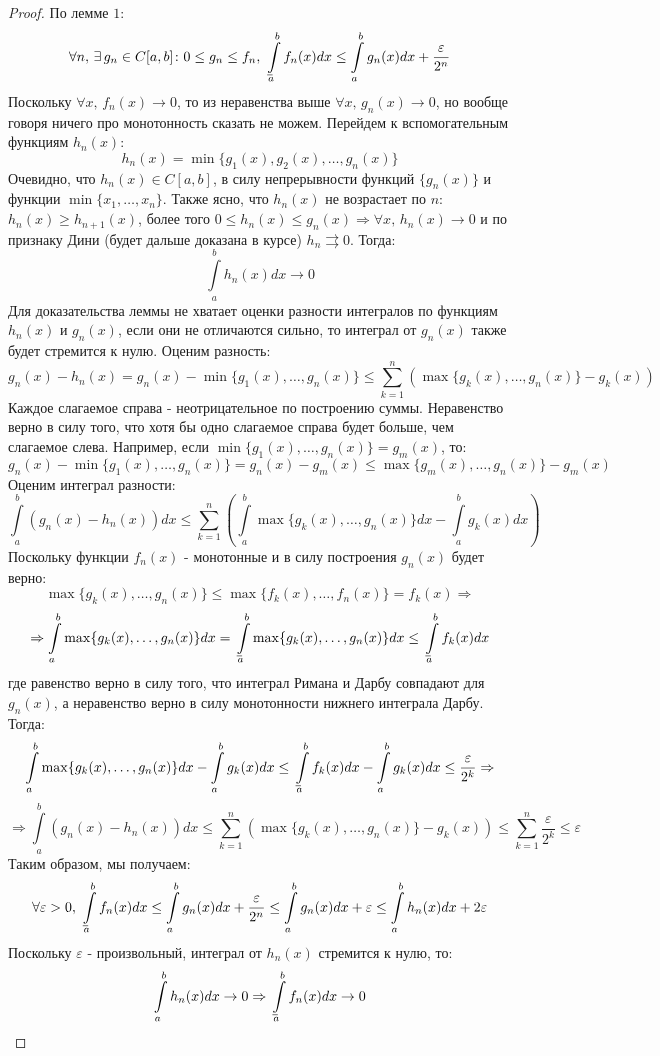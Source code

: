 \documentclass[12pt]{article}
\newcommand{\VE}{\varepsilon}
\theoremstyle{definition}
\newcommand{\ddint}[2]{\displaystyle\int\limits_{#1}^{#2}}
\newcommand{\uconv}[1]{\overset{#1}{\rightrightarrows}}
\def\lowint{\mkern3mu\underline{\vphantom{\intop}\mkern7mu}\mkern-10mu\int}
\begin{document}
\begin{proof}
	По лемме $1$:
	$$
		\forall n, \, \exists \, g_n \in C[a,b] \colon 0 \leq g_n \leq f_n, \,  \lowint\limits_{a}^{b}f_n(x)dx \leq \ddint{a}{b}g_n(x)dx + \dfrac{\VE}{2^n}
	$$
	Поскольку $\forall x, \, f_n(x) \to 0$, то из неравенства выше $\forall x, \, g_n(x) \to 0$, но вообще говоря ничего про монотонность сказать не можем. Перейдем к вспомогательным функциям $h_n(x)$:
	$$
		h_n(x) = \min\{g_1(x), g_2(x), \dotsc, g_n(x)\}
	$$
	Очевидно, что $h_n(x) \in C[a,b]$, в силу непрерывности функций $\{g_n(x)\}$ и функции $\min\{x_1, \dotsc, x_n\}$. Также ясно, что $h_n(x)$ не возрастает по $n$: $h_n(x) \geq h_{n+1}(x)$, более того $0 \leq h_n(x) \leq g_n(x) \Rightarrow \forall x, \, h_n(x) \to 0$ и по признаку Дини (будет дальше доказана в курсе) $h_n \uconv{} 0$. Тогда:
	$$
		\ddint{a}{b}h_n(x)dx \to 0
	$$
	Для доказательства леммы не хватает оценки разности интегралов по функциям $h_n(x)$ и $g_n(x)$, если они не отличаются сильно, то интеграл от $g_n(x)$ также будет стремится к нулю. Оценим разность:
	$$
		g_n(x) - h_n(x) = g_n(x) - \min\{g_1(x), \dotsc, g_n(x)\} \leq \sum\limits_{k = 1}^n \left(\max\{g_k(x),\dotsc,g_n(x)\} - g_k(x)\right)
	$$
	Каждое слагаемое справа - неотрицательное по построению суммы. Неравенство верно в силу того, что хотя бы одно слагаемое справа будет больше, чем слагаемое слева. Например, если $\min\{g_1(x), \dotsc, g_n(x)\} = g_m(x)$, то:
	$$
		 g_n(x) - \min\{g_1(x), \dotsc, g_n(x)\} = g_n(x) - g_m(x) \leq \max\{g_m(x), \dotsc, g_n(x)\} - g_m(x)
	$$
	Оценим интеграл разности:
	$$
		\ddint{a}{b} (g_n(x) - h_n(x))dx \leq \sum\limits_{k = 1}^n\left(\ddint{a}{b} \max\{g_k(x),\dotsc,g_n(x)\}dx - \ddint{a}{b}g_k(x)dx\right)
	$$
	Поскольку функции $f_n(x)$ - монотонные и в силу построения $g_n(x)$ будет верно: 
	$$
		\max\{g_k(x),\dotsc,g_n(x)\} \leq \max\{f_k(x),\dotsc,f_n(x)\} = f_k(x) \Rightarrow 
	$$
	$$
		\Rightarrow\ddint{a}{b} \max\{g_k(x),\dotsc,g_n(x)\}dx  = \lowint\limits_{a}^{b} \max\{g_k(x),\dotsc,g_n(x)\}dx \leq \lowint\limits_{a}^{b}f_k(x) dx
	$$
	где равенство верно в силу того, что интеграл Римана и Дарбу совпадают для $g_n(x)$, а неравенство верно в силу монотонности нижнего интеграла Дарбу. Тогда:
	$$
		\ddint{a}{b} \max\{g_k(x),\dotsc,g_n(x)\}dx - \ddint{a}{b}g_k(x)dx \leq \lowint\limits_{a}^{b}f_k(x) dx - \ddint{a}{b}g_k(x)dx \leq \dfrac{\VE}{2^k} \Rightarrow
	$$
	$$
		\Rightarrow \ddint{a}{b}\left(g_n(x) - h_n(x)\right)dx \leq \sum\limits_{k = 1}^n \left(\max\{g_k(x),\dotsc,g_n(x)\} - g_k(x)\right) \leq \sum\limits_{k = 1}^{n}\dfrac{\VE}{2^k} \leq \VE
	$$
	Таким образом, мы получаем:
	$$
		\forall \VE > 0, \, \lowint\limits_{a}^{b}f_n(x)dx \leq \ddint{a}{b}g_n(x)dx + \dfrac{\VE}{2^n} \leq \ddint{a}{b}g_n(x)dx + \VE \leq  \ddint{a}{b}h_n(x)dx + 2\VE
	$$
	Поскольку $\VE$ - произвольный, интеграл от $h_n(x)$ стремится к нулю, то:
	$$
		\ddint{a}{b}h_n(x)dx \to 0 \Rightarrow \lowint\limits_{a}^{b}f_n(x)dx \to 0
	$$
\end{proof}
\end{document}
